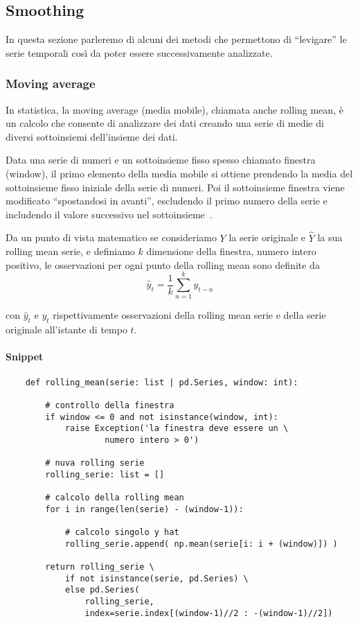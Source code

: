 \subsection{Smoothing}
In questa sezione parleremo di alcuni dei metodi che permettono di ``levigare''
le serie temporali così da poter essere successivamente analizzate.   


\subsubsection{Moving average}
In statistica, la moving average (media mobile), chiamata anche rolling mean,
è un calcolo che consente di analizzare dei dati creando una serie di 
medie di diversi sottoinsiemi dell'insieme dei dati.

Data una serie di numeri e un sottoinsieme fisso spesso chiamato finestra (window), 
il primo elemento della media mobile si ottiene prendendo la media del sottoinsieme 
fisso iniziale della serie di numeri. 
Poi il sottoinsieme finestra viene modificato ``spostandosi in avanti'', escludendo 
il primo numero della serie e includendo il valore successivo nel sottoinsieme~\cite{wiki:roll_mean}.

Da un punto di vista matematico se consideriamo $Y$ la serie originale e $\hat{Y}$ la sua 
rolling mean serie, e definiamo $k$ dimensione della finestra, numero intero positivo, le
osservazioni per ogni punto della rolling mean sono definite da
\[ \hat{y}_t = \frac{1}{k}\sum_{n = 1}^{k} y_{t-n}  \]

con $\hat{y}_t$ e $y_t$ rispettivamente osservazioni della rolling mean serie e della 
serie originale all'istante di tempo $t$.

\paragraph*{Snippet}
\begin{verbatim}
    def rolling_mean(serie: list | pd.Series, window: int):

        # controllo della finestra
        if window <= 0 and not isinstance(window, int):
            raise Exception('la finestra deve essere un \
                    numero intero > 0')

        # nuva rolling serie
        rolling_serie: list = []

        # calcolo della rolling mean
        for i in range(len(serie) - (window-1)):

            # calcolo singolo y hat
            rolling_serie.append( np.mean(serie[i: i + (window)]) )

        return rolling_serie \
            if not isinstance(serie, pd.Series) \
            else pd.Series(
                rolling_serie, 
                index=serie.index[(window-1)//2 : -(window-1)//2])
\end{verbatim}

